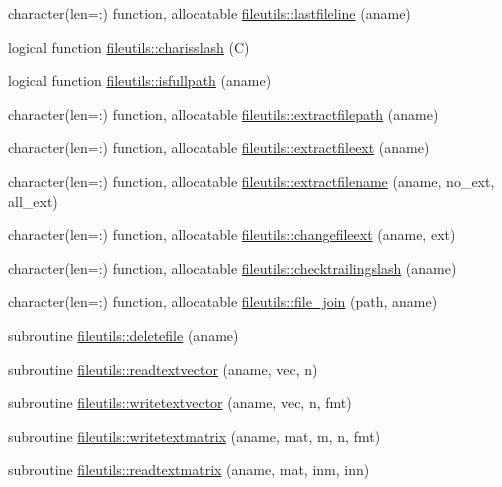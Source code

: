 \begin{DoxyCompactItemize}
\item 
character(len=\+:) function, allocatable \mbox{\hyperlink{namespacefileutils_ae3e1c820dd72fbdae478ed44d5cd065c}{fileutils\+::lastfileline}} (aname)
\item 
logical function \mbox{\hyperlink{namespacefileutils_a325f66a61f2de7872003adf25ec2bfbd}{fileutils\+::charisslash}} (C)
\item 
logical function \mbox{\hyperlink{namespacefileutils_a89b6c0a1ef1dc72e17a37f50a71a98ed}{fileutils\+::isfullpath}} (aname)
\item 
character(len=\+:) function, allocatable \mbox{\hyperlink{namespacefileutils_a5debf7f081524e507253598ba943ad1a}{fileutils\+::extractfilepath}} (aname)
\item 
character(len=\+:) function, allocatable \mbox{\hyperlink{namespacefileutils_a58b75841484f583d4f7da47c8fa217b6}{fileutils\+::extractfileext}} (aname)
\item 
character(len=\+:) function, allocatable \mbox{\hyperlink{namespacefileutils_a3a05468f7b2b38570ebb0f21256d2bfb}{fileutils\+::extractfilename}} (aname, no\+\_\+ext, all\+\_\+ext)
\item 
character(len=\+:) function, allocatable \mbox{\hyperlink{namespacefileutils_a54603adc7cf7864b6f4fe0e3d2b951d3}{fileutils\+::changefileext}} (aname, ext)
\item 
character(len=\+:) function, allocatable \mbox{\hyperlink{namespacefileutils_a61ab2a304f35a84f39731548b11393a2}{fileutils\+::checktrailingslash}} (aname)
\item 
character(len=\+:) function, allocatable \mbox{\hyperlink{namespacefileutils_abc59cd6627541557f05e51e8571b77d6}{fileutils\+::file\+\_\+join}} (path, aname)
\item 
subroutine \mbox{\hyperlink{namespacefileutils_a4123c8130fff81627f5a0bdd7674d6f7}{fileutils\+::deletefile}} (aname)
\item 
subroutine \mbox{\hyperlink{namespacefileutils_ab6b6b5446754f42206e21485cb75e539}{fileutils\+::readtextvector}} (aname, vec, n)
\item 
subroutine \mbox{\hyperlink{namespacefileutils_abd621ad851fccd7a5f79146e2841c380}{fileutils\+::writetextvector}} (aname, vec, n, fmt)
\item 
subroutine \mbox{\hyperlink{namespacefileutils_a9620c143afd6e00aa410fb9e0f5bad25}{fileutils\+::writetextmatrix}} (aname, mat, m, n, fmt)
\item 
subroutine \mbox{\hyperlink{namespacefileutils_a34de05bb4524587b63bb0eb4bebd6e4a}{fileutils\+::readtextmatrix}} (aname, mat, inm, inn)

\end{DoxyCompactItemize}
